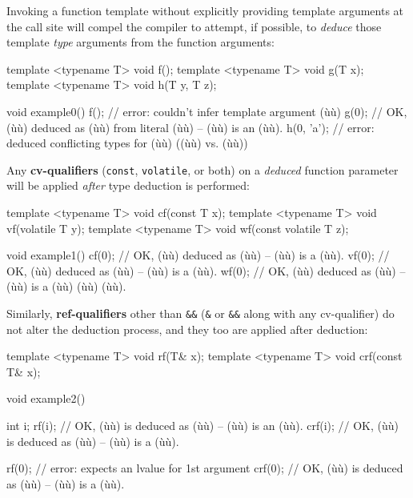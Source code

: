Invoking a function template without explicitly providing template
arguments at the call site will compel the compiler to attempt, if
possible, to \emph{deduce} those template \emph{type} arguments from the
function arguments:

\begin{emcppslisting}
template <typename T> void f();
template <typename T> void g(T x);
template <typename T> void h(T y, T z);

void example0()
{
    f();        // error: couldn't infer template argument (ù{}ù)
    g(0);       // OK, (ù{}ù) deduced as (ù{}ù) from literal (ù{}ù) -- (ù{}ù) is an (ù{}ù).
    h(0, 'a');  // error: deduced conflicting types for (ù{}ù) ((ù{}ù) vs. (ù{}ù))
}
\end{emcppslisting}

\noindent Any \textbf{cv-qualifiers} (\texttt{const}, \texttt{volatile}, or both)
on a \emph{deduced} function parameter will be applied \emph{after} type
deduction is performed:

\begin{emcppslisting}
template <typename T> void cf(const T x);
template <typename T> void vf(volatile T y);
template <typename T> void wf(const volatile T z);

void example1()
{
    cf(0);  // OK, (ù{}ù) deduced as (ù{}ù) -- (ù{}ù) is a (ù{}ù).
    vf(0);  // OK, (ù{}ù) deduced as (ù{}ù) -- (ù{}ù) is a (ù{}ù).
    wf(0);  // OK, (ù{}ù) deduced as (ù{}ù) -- (ù{}ù) is a (ù{}ù) (ù{}ù) (ù{}ù).
}
\end{emcppslisting}

\noindent Similarly, \textbf{ref-qualifiers} other than \texttt{\&\&}
(\texttt{\&} or \texttt{\&\&} along with any cv-qualifier) do not
alter the deduction process, and they too are applied after deduction:

\begin{emcppslisting}
template <typename T> void rf(T& x);
template <typename T> void crf(const T& x);

void example2()
{
    int i;
    rf(i);   // OK, (ù{}ù) is deduced as (ù{}ù) -- (ù{}ù) is an (ù{}ù).
    crf(i);  // OK, (ù{}ù) is deduced as (ù{}ù) -- (ù{}ù) is a (ù{}ù).

    rf(0);   // error: expects an lvalue for 1st argument
    crf(0);  // OK, (ù{}ù) is deduced as (ù{}ù) -- (ù{}ù) is a (ù{}ù).
}
\end{emcppslisting}

